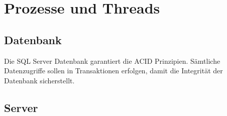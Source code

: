 \chapter{Prozesse und Threads}
	\section{Datenbank}
	Die SQL Server Datenbank garantiert die ACID Prinzipien. Sämtliche Datenzugriffe sollen in Transaktionen erfolgen, damit die Integrität der Datenbank sicherstellt.
	
	\section{Server}
	